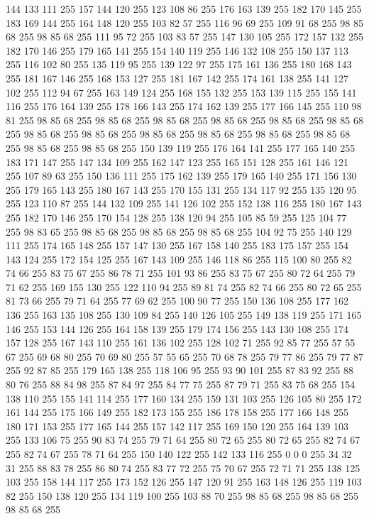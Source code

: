 144 133 111 255 157 144 120 255 123 108 86 255 176 163 139 255 182 170 145 255 183 169 144 255 164 148 120 255 103 82 57 255 116 96 69 255 109 91 68 255 98 85 68 255 98 85 68 255 111 95 72 255 103 83 57 255 147 130 105 255 172 157 132 255 182 170 146 255 179 165 141 255 154 140 119 255 146 132 108 255 150 137 113 255 116 102 80 255 135 119 95 255 139 122 97 255 175 161 136 255 180 168 143 255 181 167 146 255 168 153 127 255 181 167 142 255 174 161 138 255 141 127 102 255 112 94 67 255 163 149 124 255 168 155 132 255 153 139 115 255 155 141 116 255 176 164 139 255 178 166 143 255 174 162 139 255 177 166 145 255 110 98 81 255 98 85 68 255 98 85 68 255 98 85 68 255 98 85 68 255 98 85 68 255 98 85 68 255 98 85 68 255 98 85 68 255 98 85 68 255 98 85 68 255 98 85 68 255 98 85 68 255 98 85 68 255 98 85 68 255 150 139 119 255 176 164 141 255 177 165 140 255 183 171 147 255 147 134 109 255 162 147 123 255 165 151 128 255 161 146 121 255 107 89 63 255
150 136 111 255 175 162 139 255 179 165 140 255 171 156 130 255 179 165 143 255 180 167 143 255 170 155 131 255 134 117 92 255 135 120 95 255 123 110 87 255 144 132 109 255 141 126 102 255 152 138 116 255 180 167 143 255 182 170 146 255 170 154 128 255 138 120 94 255 105 85 59 255 125 104 77 255 98 83 65 255 98 85 68 255 98 85 68 255 98 85 68 255 104 92 75 255 140 129 111 255 174 165 148 255 157 147 130 255 167 158 140 255 183 175 157 255 154 143 124 255 172 154 125 255 167 143 109 255 146 118 86 255 115 100 80 255 82 74 66 255 83 75 67 255 86 78 71 255 101 93 86 255 83 75 67 255 80 72 64 255 79 71 62 255 169 155 130 255 122 110 94 255 89 81 74 255 82 74 66 255 80 72 65 255 81 73 66 255 79 71 64 255 77 69 62 255 100 90 77 255 150 136 108 255 177 162 136 255 163 135 108 255 130 109 84 255 140 126 105 255 149 138 119 255 171 165 146 255 153 144 126 255 164 158 139 255 179 174 156 255 143 130 108 255 174 157 128 255 167 143 110 255 161 136 102 255
128 102 71 255 92 85 77 255 57 55 67 255 69 68 80 255 70 69 80 255 57 55 65 255 70 68 78 255 79 77 86 255 79 77 87 255 92 87 85 255 179 165 138 255 118 106 95 255 93 90 101 255 87 83 92 255 88 80 76 255 88 84 98 255 87 84 97 255 84 77 75 255 87 79 71 255 83 75 68 255 154 138 110 255 155 141 114 255 177 160 134 255 159 131 103 255 126 105 80 255 172 161 144 255 175 166 149 255 182 173 155 255 186 178 158 255 177 166 148 255 180 171 153 255 177 165 144 255 157 142 117 255 169 150 120 255 164 139 103 255 133 106 75 255 90 83 74 255 79 71 64 255 80 72 65 255 80 72 65 255 82 74 67 255 82 74 67 255 78 71 64 255 150 140 122 255 142 133 116 255 0 0 0 255 34 32 31 255 88 83 78 255 86 80 74 255 83 77 72 255 75 70 67 255 72 71 71 255 138 125 103 255 158 144 117 255 173 152 126 255 147 120 91 255 163 148 126 255 119 103 82 255 150 138 120 255 134 119 100 255 103 88 70 255 98 85 68 255 98 85 68 255 98 85 68 255
